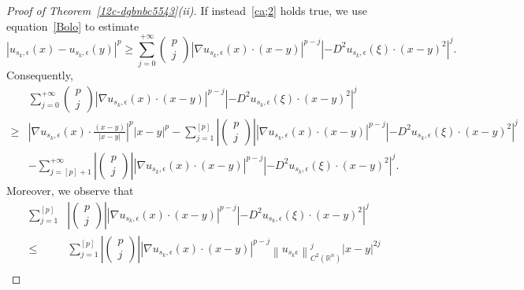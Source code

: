 \documentclass[12pt]{article}
\newcommand{\R}{\mathbb{R}}
\numberwithin{equation}{section}
\renewcommand{\leq}{\leqslant}
\renewcommand{\geq}{\geqslant}
\begin{document}
\begin{proof}[Proof of Theorem~\ref{12c-dgbnbc5543}(ii)]
If instead~\eqref{ca;2} holds true, we use equation~\eqref{Bolo}  to estimate  
\begin{equation}\label{unrefdvgt56432}
\left|u_{s_k,\epsilon}(x)-u_{s_k,\epsilon}(y)\right|^p \geq \sum_{j=0}^{+\infty}\begin{pmatrix}p\\j \end{pmatrix}\left|\nabla u_{s_k,\epsilon} (x) \cdot(x-y)\right|^{p-j}\left|-D^2u_{s_k,\epsilon}(\xi)\cdot(x-y)^2 \right|^{j}. 
\end{equation}
Consequently,
\begin{equation}\label{iknfdcerty}
\begin{split}
&\sum_{j=0}^{+\infty} \begin{pmatrix}p\\j \end{pmatrix}\left|\nabla u_{s_k,\epsilon} (x) \cdot(x-y)\right|^{p-j}\left|-D^2u_{s_k,\epsilon}(\xi)\cdot(x-y)^2 \right|^{j}\\
\geq &\left|\nabla u_{s_k,\epsilon} (x) \cdot\frac{(x-y)}{\left|x-y\right|}\right|^p\left|x-y\right|^p-\sum_{j=1}^{[p]}\left| \begin{pmatrix}p\\j \end{pmatrix}\right|\left|\nabla u_{s_k,\epsilon} (x) \cdot(x-y)\right|^{p-j}\left|-D^2u_{s_k,\epsilon}(\xi)\cdot(x-y)^2 \right|^{j}\\
&-\sum_{j=[p]+1}^{+\infty}\left| \begin{pmatrix}p\\j \end{pmatrix}\right|\left|\nabla u_{s_k,\epsilon} (x) \cdot(x-y)\right|^{p-j}\left|-D^2u_{s_k,\epsilon}(\xi)\cdot(x-y)^2 \right|^{j}.
\end{split}
\end{equation}
Moreover, we observe that
\begin{equation}\label{KGBFTERFD}
\begin{split}
\sum_{j=1}^{[p]} &\left| \begin{pmatrix}p\\j \end{pmatrix}\right|\left|\nabla u_{s_k,\epsilon} (x) \cdot(x-y)\right|^{p-j}\left|-D^2u_{s_k,\epsilon}(\xi)\cdot(x-y)^2 \right|^{j} \\
\leq & \sum_{j=1}^{\left[p\right]} \left|\begin{pmatrix}p\\j \end{pmatrix}\right|\left|\nabla u_{s_k,\epsilon} (x) \cdot(x-y)\right|^{p-j}\left\|u_{s_k\epsilon}\right\|_{C^2(\R^n)}^{j}\left|x-y\right|^{2j}\\

\end{split}
\end{equation}
\end{proof}
\end{document}
